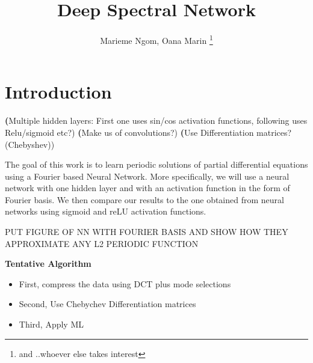 \documentclass[11pt]{article}
\begin{document}

\title{Deep Spectral Network}
\author{Marieme Ngom, Oana Marin \footnote{and ..whoever else takes interest}}
\maketitle
\begin{abstract}

\end{abstract}




\linenumbers

\section{Introduction}
\textbf(Multiple hidden layers: First one uses sin/cos activation functions, following uses Relu/sigmoid etc?)
\textbf(Make us of convolutions?)
\textbf(Use Differentiation matrices?(Chebyshev))


The goal of this work is to learn periodic solutions of partial differential equations using a Fourier based Neural Network. More specifically, we will use a neural network with one hidden layer and with an activation function in the form of Fourier basis. We then compare our results to the one obtained from neural networks using sigmoid and reLU activation functions.

PUT FIGURE OF NN WITH FOURIER BASIS AND SHOW HOW THEY APPROXIMATE ANY L2 PERIODIC  FUNCTION

\textbf{Tentative Algorithm}
\begin{itemize}
\item First, compress the data using DCT plus mode selections
\item Second, Use Chebychev Differentiation matrices
\item Third, Apply ML

\end{itemize}






\end{document}
